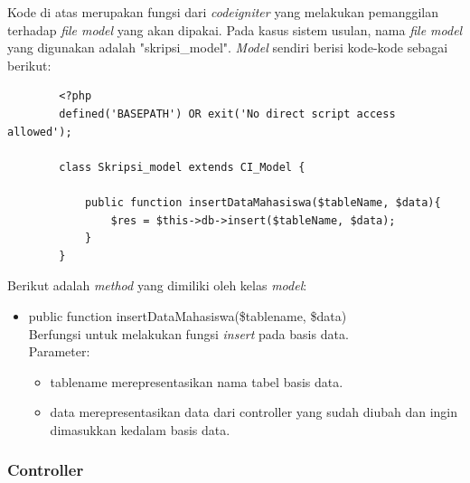 	Kode di atas merupakan fungsi dari \textit{codeigniter} yang melakukan pemanggilan terhadap \textit{file model} yang akan dipakai. Pada kasus sistem usulan, nama \textit{file model} yang digunakan adalah "skripsi\_model". \textit{Model} sendiri berisi kode-kode sebagai berikut:
	\begin{lstlisting}
		<?php
		defined('BASEPATH') OR exit('No direct script access allowed');
		
		class Skripsi_model extends CI_Model {
		
			public function insertDataMahasiswa($tableName, $data){
				$res = $this->db->insert($tableName, $data);
			}
		}
	\end{lstlisting}
	
	Berikut adalah \textit{method} yang dimiliki oleh kelas \textit{model}:
	\begin{itemize}
		\item public function insertDataMahasiswa(\$tablename, \$data)\\
		Berfungsi untuk melakukan fungsi \textit{insert} pada basis data.\\
		Parameter: 
		\begin{itemize}
			\item tablename merepresentasikan nama tabel basis data.
			\item data merepresentasikan data dari controller yang sudah diubah dan ingin dimasukkan kedalam basis data.
		\end{itemize}
	\end{itemize}
	
	\subsubsection{Controller}
	\label{subsub: controllerCI}
	
